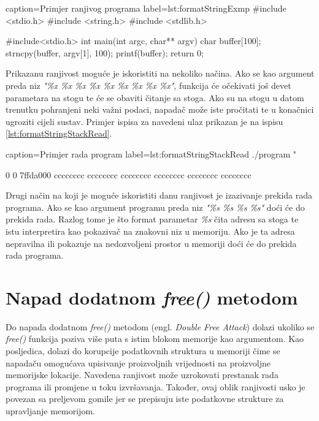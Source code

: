 \documentclass[times, utf8, diplomski, numeric]{fer}
\begin{document}
\pagebreak %

\begin{ispis} {caption=Primjer ranjivog programa} {label=lst:formatStringExmp}
#include  <stdio.h>
#include  <string.h>
#include  <stdlib.h>

#include<stdio.h>
int main(int argc, char** argv) {
	char buffer[100];
	strncpy(buffer, argv[1], 100);
	printf(buffer);
	return 0;
}
\end{ispis}

Prikazanu ranjivost moguće je iskoristiti na nekoliko načina.
Ako se kao argument preda niz \emph{"\%x \%x \%x \%x \%x \%x
\%x \%x \%x"}, funkcija će očekivati još devet parametara na
stogu te će se obaviti čitanje sa stoga. Ako su na stogu u
datom trenutku pohranjeni neki važni podaci, napadač može iste
pročitati te u konačnici ugroziti cijeli sustav. Primjer ispisa
za navedeni ulaz prikazan je na ispisu 
\ref{lst:formatStringStackRead}.

\begin{ispis} {caption=Primjer rada program} {label=lst:formatStringStackRead}
./program "%

0 0 7ffda000 cccccccc cccccccc cccccccc cccccccc cccccccc cccccccc
\end{ispis}

Drugi način na koji je moguće iskoristiti danu ranjivost je
izazivanje prekida rada programa. Ako se kao argument
programu preda niz \emph{"\%s \%s \%s \%s"} doći će do prekida rada.
Razlog tome je što format parametar \emph{\%s} čita adresu sa
stoga te istu interpretira kao pokazivač na znakovni niz u
memoriju. Ako je ta adresa nepravilna ili pokazuje na
nedozvoljeni prostor u memoriji doći će do prekida rada programa.

\section{Napad dodatnom \emph{free()} metodom}

Do napada dodatnom \emph{free()} metodom (engl. \emph{Double Free
Attack}) dolazi ukoliko se \emph{free()} funkcija poziva više
puta s istim blokom memorije kao argumentom. Kao posljedica,
dolazi do korupcije podatkovnih struktura u memoriji čime se
napadaču omogućava upisivanje proizvoljnih vrijednosti na
proizvoljne memorijske lokacije. Navedena ranjivost može
uzrokovati prestanak rada programa ili promjene u toku
izvršavanja. Također, ovaj oblik ranjivosti usko je povezan sa
preljevom gomile jer se prepisuju iste podatkovne strukture za
upravljanje memorijom.
\end{document}
